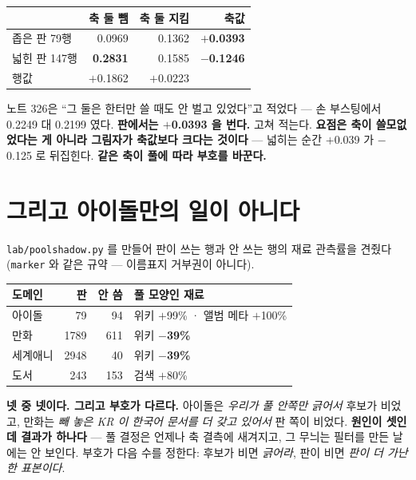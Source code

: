 \documentclass[10pt]{article}
\begin{document}
\begin{center}\footnotesize
\begin{tabular}{lrrr}
\hline
 & 축 둘 뺌 & 축 둘 지킴 & 축값 \\
\hline
좁은 판 79행 & 0.0969 & 0.1362 & \textbf{$+$0.0393} \\
넓힌 판 147행 & \textbf{0.2831} & 0.1585 & \textbf{$-$0.1246} \\
\hline
행값 & $+$0.1862 & $+$0.0223 & \\
\hline
\end{tabular}
\end{center}

노트 326은 ``그 둘은 한터만 쓸 때도 안 벌고 있었다''고 적었다 --- 손
부스팅에서 0.2249 대 0.2199 였다. \textbf{판에서는 $+$0.0393 을 번다.}
고쳐 적는다. \textbf{요점은 축이 쓸모없었다는 게 아니라 그림자가 축값보다
크다는 것이다} --- 넓히는 순간 $+$0.039 가 $-$0.125 로 뒤집힌다.
\textbf{같은 축이 풀에 따라 부호를 바꾼다.}

\section{그리고 아이돌만의 일이 아니다}

\texttt{lab/poolshadow.py} 를 만들어 판이 쓰는 행과 안 쓰는 행의 재료
관측률을 견줬다(\texttt{marker} 와 같은 규약 --- 이름표지 거부권이 아니다).

\begin{center}\footnotesize
\begin{tabular}{lrrl}
\hline
도메인 & 판 & 안 씀 & 풀 모양인 재료 \\
\hline
아이돌 & 79 & 94 & 위키 $+$99\% · 앨범 메타 $+$100\% \\
만화 & 1789 & 611 & 위키 \textbf{$-$39\%} \\
세계애니 & 2948 & 40 & 위키 \textbf{$-$39\%} \\
도서 & 243 & 153 & 검색 $+$80\% \\
\hline
\end{tabular}
\end{center}

\textbf{넷 중 넷이다. 그리고 부호가 다르다.} 아이돌은 \emph{우리가 풀
안쪽만 긁어서} 후보가 비었고, 만화는 \emph{빼 놓은 KR 이 한국어 문서를
더 갖고 있어서} 판 쪽이 비었다. \textbf{원인이 셋인데 결과가 하나다} ---
풀 결정은 언제나 축 결측에 새겨지고, 그 무늬는 필터를 만든 날에는 안 보인다.
부호가 다음 수를 정한다: 후보가 비면 \emph{긁어라}, 판이 비면 \emph{판이
더 가난한 표본이다}.
\end{document}
